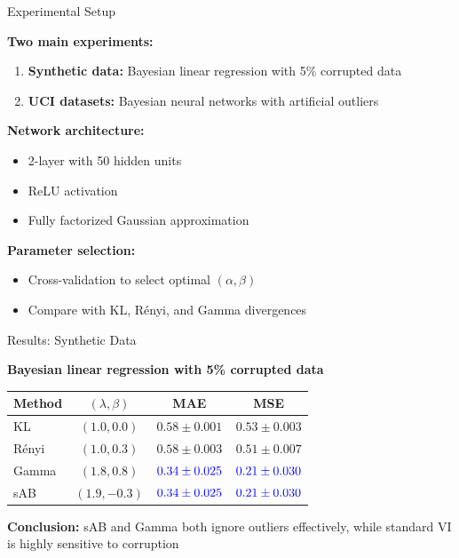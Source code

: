 \documentclass{beamer}
\theoremstyle{definition}
\theoremstyle{plain}
\begin{document}
\begin{frame}{Experimental Setup}

\textbf{Two main experiments:}

\begin{enumerate}
    \item \textbf{Synthetic data:} Bayesian linear regression with 5\% corrupted data
    \item \textbf{UCI datasets:} Bayesian neural networks with artificial outliers
\end{enumerate}

\vspace{0.3cm}

\textbf{Network architecture:}
\begin{itemize}
    \item 2-layer with 50 hidden units
    \item ReLU activation
    \item Fully factorized Gaussian approximation
\end{itemize}

\vspace{0.3cm}

\textbf{Parameter selection:}
\begin{itemize}
    \item Cross-validation to select optimal $(\alpha, \beta)$
    \item Compare with KL, Rényi, and Gamma divergences
\end{itemize}

\end{frame}
\begin{frame}{Results: Synthetic Data}

\textbf{Bayesian linear regression with 5\% corrupted data}

\vspace{0.3cm}

\begin{table}[]
\centering
\begin{tabular}{|l|c|c|c|}
\hline
\textbf{Method} & $(\lambda, \beta)$ & \textbf{MAE} & \textbf{MSE} \\
\hline
KL & $(1.0, 0.0)$ & $0.58 \pm 0.001$ & $0.53 \pm 0.003$ \\
\hline
Rényi & $(1.0, 0.3)$ & $0.58 \pm 0.003$ & $0.51 \pm 0.007$ \\
\hline
Gamma & $(1.8, 0.8)$ & $\textcolor{blue}{0.34 \pm 0.025}$ & $\textcolor{blue}{0.21 \pm 0.030}$ \\
\hline
sAB & $(1.9, -0.3)$ & $\textcolor{blue}{0.34 \pm 0.025}$ & $\textcolor{blue}{0.21 \pm 0.030}$ \\
\hline
\end{tabular}
\end{table}

\vspace{0.3cm}

\textbf{Conclusion:} sAB and Gamma both ignore outliers effectively, while standard VI is highly sensitive to corruption

\end{frame}
\end{document}
